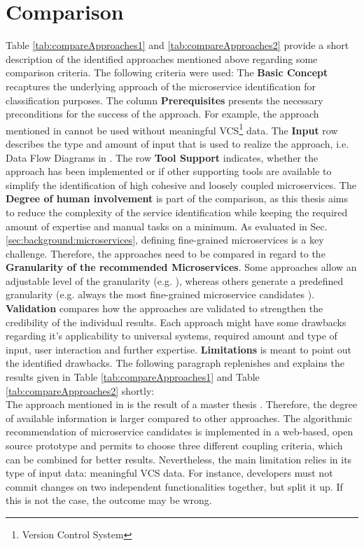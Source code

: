 \section{Comparison} 
\label{sec:stateOfTheArt:comparison}

Table \ref{tab:compareApproaches1} and \ref{tab:compareApproaches2} provide a short description of the identified approaches mentioned above regarding some comparison criteria. The following criteria were used: The \textbf{Basic Concept} recaptures the underlying approach of the microservice identification for classification purposes. The column \textbf{Prerequisites} presents the necessary preconditions for the success of the approach. For example, the approach mentioned in \cite{ExtractionMazlami} cannot be used without meaningful VCS\footnote{Version Control System} data. The \textbf{Input} row describes the type and amount of input that is used to realize the approach, i.e. Data Flow Diagrams in \cite{DataflowDrivenChen}. The row \textbf{Tool Support} indicates, whether the approach has been implemented or if other supporting tools are available to simplify the identification of high cohesive and loosely coupled microservices. The \textbf{Degree of human involvement} is part of the comparison, as this thesis aims to reduce the complexity of the service identification while keeping the required amount of expertise and manual tasks on a minimum. As evaluated in Sec.\ref{sec:background:microservices}, defining fine-grained microservices is a key challenge. Therefore, the approaches need to be compared in regard to the \textbf{Granularity of the recommended Microservices}. Some approaches allow an adjustable level of the granularity (e.g. \cite{ExtractionMazlami}), whereas others generate a predefined granularity (e.g. always the most fine-grained microservice candidates \cite{HeuristicsAlwis}). \textbf{Validation} compares how the approaches are validated to strengthen the credibility of the individual results. Each approach might have some drawbacks regarding it's applicability to universal systems, required amount and type of input, user interaction and further expertise. \textbf{Limitations} is meant to point out the identified drawbacks. The following paragraph replenishes and explains the results given in Table \ref{tab:compareApproaches1} and Table \ref{tab:compareApproaches2} shortly: \\

\noindent
The approach mentioned in \cite{ExtractionMazlami} is the result of a master thesis \cite{Mazlami}. Therefore, the degree of available information is larger compared to other approaches. The algorithmic recommendation of microservice candidates is implemented in a web-based, open source prototype and permits to choose three different coupling criteria, which can be combined for better results. Nevertheless, the main limitation relies in its type of input data: meaningful VCS data. For instance, developers must not commit changes on two independent functionalities together, but split it up. If this is not the case, the outcome may be wrong. \\

